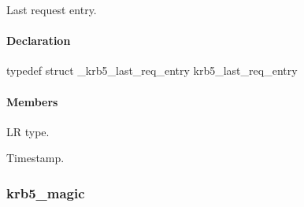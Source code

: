 \documentclass[letterpaper,10pt,english]{sphinxmanual}
\begin{document}
Last request entry.


\paragraph{Declaration}
\label{appdev/refs/types/krb5_last_req_entry:declaration}
typedef struct \_krb5\_last\_req\_entry  krb5\_last\_req\_entry


\paragraph{Members}
\label{appdev/refs/types/krb5_last_req_entry:members}

\begin{fulllineitems}
\label{appdev/refs/types/krb5_last_req_entry:c.krb5_last_req_entry.magic}
\end{fulllineitems}


\begin{fulllineitems}
\label{appdev/refs/types/krb5_last_req_entry:c.krb5_last_req_entry.lr_type}
LR type.

\end{fulllineitems}


\begin{fulllineitems}
\label{appdev/refs/types/krb5_last_req_entry:c.krb5_last_req_entry.value}
Timestamp.

\end{fulllineitems}



\subsubsection{krb5\_magic}
\label{appdev/refs/types/krb5_magic:krb5-magic}\label{appdev/refs/types/krb5_magic::doc}\label{appdev/refs/types/krb5_magic:krb5-magic-struct}

\begin{fulllineitems}
\label{appdev/refs/types/krb5_magic:c.krb5_magic}
\end{fulllineitems}
\end{document}
